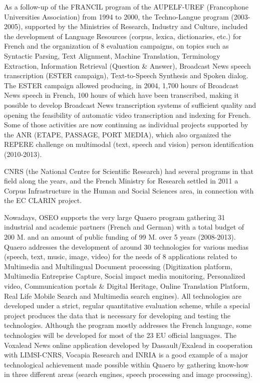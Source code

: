 \documentclass[10pt, plain]{../../metanetpaper}
\begin{document}
\begin{multicols}{2}
As a follow-up of the FRANCIL program of the AUPELF-UREF (Francophone Universities Association) from 1994 to 2000, the Techno-Langue program (2003-2005), supported by the Ministries of Research, Industry and Culture, included the development of Language Resources (corpus, lexica, dictionaries, etc.) for French and the organization of 8 evaluation campaigns, on topics such as Syntactic Parsing, Text Alignment, Machine Translation, Terminology Extraction, Information Retrieval (Question \& Answer), Broadcast News speech transcription (ESTER campaign), Text-to-Speech Synthesis and Spoken dialog. The ESTER campaign allowed producing, in 2004, 1,700 hours of Broadcast News speech in French, 100 hours of which have been transcribed, making it possible to develop Broadcast News transcription systems of sufficient quality and opening the feasibility of automatic video transcription and indexing for French.  Some of those activities are now continuing as individual projects supported by the ANR (ETAPE, PASSAGE, PORT MEDIA), which also organized the REPERE challenge on multimodal (text, speech and vision) person identification (2010-2013).

CNRS (the National Centre for Scientific Research) had several programs in that field along the years, and the French Ministry for Research settled in 2011 a Corpus Infrastructure in the Human and Social Sciences area, in connection with the EC CLARIN project.

Nowadays, OSEO supports the very large Quaero program gathering 31 industrial and academic partners (French and German) with a total budget of 200 M. and an amount of public funding of 99 M. over 5 years (2008-2013). Quaero addresses the development of around 30 technologies for various medias (speech, text, music, image, video) for the needs of 8 applications related to Multimedia and Multilingual Document processing (Digitization platform, Multimedia Entreprise Capture, Social impact media monitoring, Personalized video, Communication portals \& Digital Heritage, Online Translation Platform, Real Life Mobile Search and Multimedia search engines). All technologies are developed under a strict, regular quantitative evaluation scheme, while a special project produces the data that is necessary for developing and testing the technologies. Although the program mostly addresses the French language, some technologies will be developed for most of the 23 EU official languages. The Voxalead News online application developed by Dassault/Exalead in cooperation with LIMSI-CNRS, Vocapia Research and INRIA is a good example of a major technological achievement made possible within Quaero by gathering know-how in three different areas (search engines, speech processing and image processing). 


\end{multicols}
\end{document}
